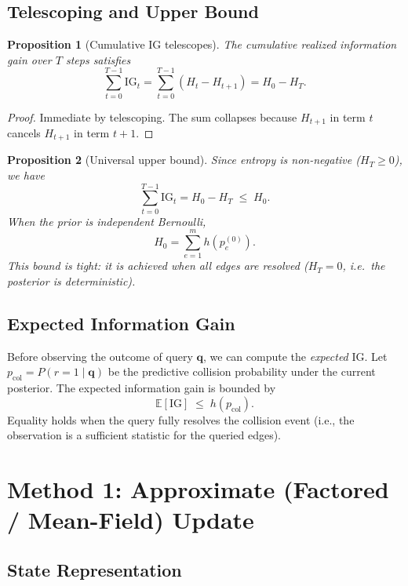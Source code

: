 \documentclass[11pt]{article}
\newtheorem{proposition}{Proposition}
\begin{document}
\subsection{Telescoping and Upper Bound}

\begin{proposition}[Cumulative IG telescopes]
\label{prop:telescope}
The cumulative realized information gain over $T$ steps satisfies
\[
  \sum_{t=0}^{T-1} \mathrm{IG}_t
  = \sum_{t=0}^{T-1} (H_t - H_{t+1})
  = H_0 - H_T.
\]
\end{proposition}

\begin{proof}
Immediate by telescoping.  The sum collapses because $H_{t+1}$ in term $t$
cancels $H_{t+1}$ in term $t{+}1$.
\end{proof}

\begin{proposition}[Universal upper bound]
\label{prop:upperbound}
Since entropy is non-negative ($H_T \geq 0$), we have
\[
  \sum_{t=0}^{T-1} \mathrm{IG}_t = H_0 - H_T \;\leq\; H_0.
\]
When the prior is independent Bernoulli,
\[
  H_0 = \sum_{e=1}^{m} h(p_e^{(0)}).
\]
This bound is tight: it is achieved when all edges are resolved
($H_T = 0$, i.e.\ the posterior is deterministic).
\end{proposition}

\subsection{Expected Information Gain}

Before observing the outcome of query $\mathbf{q}$, we can compute the
\emph{expected} IG.  Let $p_{\text{col}} = P(r=1 \mid \mathbf{q})$ be
the predictive collision probability under the current posterior.  The
expected information gain is bounded by
\[
  \mathbb{E}[\mathrm{IG}] \;\leq\; h(p_{\text{col}}).
\]
Equality holds when the query fully resolves the collision event (i.e.,
the observation is a sufficient statistic for the queried edges).

\section{Method 1: Approximate (Factored / Mean-Field) Update}
\label{sec:approximate}

\subsection{State Representation}
\end{document}
